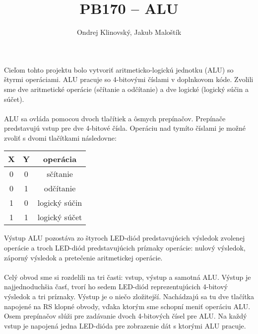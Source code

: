 \documentclass{article}
\title{PB170 -- ALU}
\author{Ondrej Klinovský, Jakub Maloštík}
\begin{document}
    \maketitle

    \paragraph{}
    Cieľom tohto projektu bolo vytvoriť aritmeticko-logickú jednotku (ALU) so štyrmi operáciami. ALU pracuje so 4-bitovými číslami v doplnkovom kóde. Zvolili sme dve aritmetické operácie (sčítanie a odčítanie) a dve logické (logický súčin a súčet).
    \paragraph{}
    ALU sa ovláda pomocou dvoch tlačítiek a ôsmych prepínačov. Prepínače predstavujú vstup pre dve 4-bitové čísla. Operáciu nad tymíto číslami je možné zvoliť s dvomi tlačítkami následovne:
    \begin{center}
    \begin{tabular}{| c | c | c |}
        \hline
        X & Y & operácia \\
        \hline
        0 & 0 & sčítanie \\
        0 & 1 & odčítanie \\
        1 & 0 & logický súčin \\
        1 & 1 & logický súčet \\
        \hline
    \end{tabular}
    \end{center}
    Výstup ALU pozostáva zo štyroch LED-diód predstavujúcich výsledok zvolenej operácie a troch LED-diód predstavujúcich príznaky operácie: nulový výsledok, záporný výsledok a pretečenie aritmetickej operácie.
    \paragraph{}
    Celý obvod sme si rozdelili na tri časti: vstup, výstup a samotná ALU. Výstup je najjednoduchšia časť, tvorí ho sedem LED-diód reprezentujúcich 4-bitový výsledok a tri príznaky. Výstup je o niečo zložitejší. Nachádzajú sa tu dve tlačítka napojené na RS klopné obvody, vďaka ktorým sme schopní meniť operáciu ALU. Osem prepínačov slúži pre zadávanie dvoch 4-bitových čísel pre ALU. Na každý vstup je napojená jedna LED-dióda pre zobrazenie dát s ktorými ALU pracuje.
\end{document}
